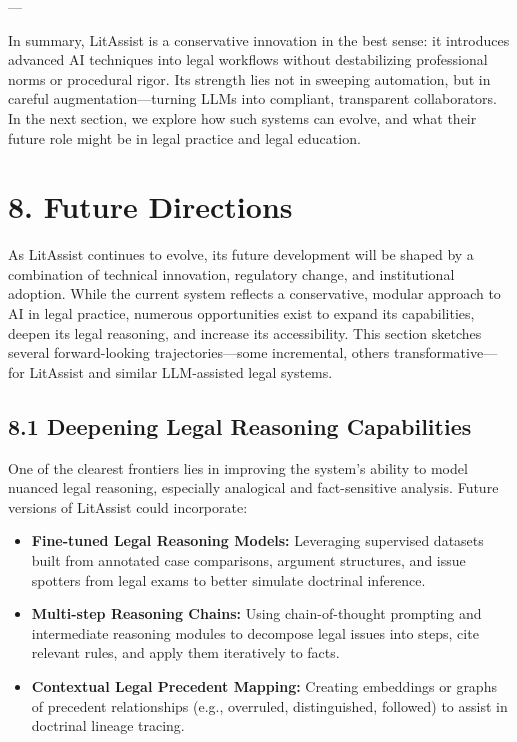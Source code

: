 \documentclass[12pt,a4paper]{article}
\begin{document}
---

In summary, LitAssist is a conservative innovation in the best sense: it introduces advanced AI techniques into legal workflows without destabilizing professional norms or procedural rigor. Its strength lies not in sweeping automation, but in careful augmentation—turning LLMs into compliant, transparent collaborators. In the next section, we explore how such systems can evolve, and what their future role might be in legal practice and legal education.

\section*{8. Future Directions}

As LitAssist continues to evolve, its future development will be shaped by a combination of technical innovation, regulatory change, and institutional adoption. While the current system reflects a conservative, modular approach to AI in legal practice, numerous opportunities exist to expand its capabilities, deepen its legal reasoning, and increase its accessibility. This section sketches several forward-looking trajectories—some incremental, others transformative—for LitAssist and similar LLM-assisted legal systems.

\subsection*{8.1 Deepening Legal Reasoning Capabilities}

One of the clearest frontiers lies in improving the system's ability to model nuanced legal reasoning, especially analogical and fact-sensitive analysis. Future versions of LitAssist could incorporate:

\begin{itemize}
\item \textbf{Fine-tuned Legal Reasoning Models:} Leveraging supervised datasets built from annotated case comparisons, argument structures, and issue spotters from legal exams to better simulate doctrinal inference.

\item \textbf{Multi-step Reasoning Chains:} Using chain-of-thought prompting and intermediate reasoning modules to decompose legal issues into steps, cite relevant rules, and apply them iteratively to facts.

\item \textbf{Contextual Legal Precedent Mapping:} Creating embeddings or graphs of precedent relationships (e.g., overruled, distinguished, followed) to assist in doctrinal lineage tracing.
\end{itemize}
\end{document}
